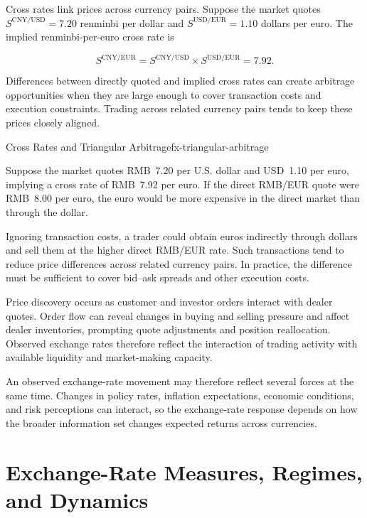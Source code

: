 Cross rates link prices across currency pairs. Suppose the market quotes $S^{\mathrm{CNY/USD}}=7.20$ renminbi per dollar and $S^{\mathrm{USD/EUR}}=1.10$ dollars per euro. The implied renminbi-per-euro cross rate is

\begin{equation*}
S^{\mathrm{CNY/EUR}}
=S^{\mathrm{CNY/USD}}\times
S^{\mathrm{USD/EUR}}
=7.92.
\label{eq:ch10-cross-rate}
\end{equation*}

Differences between directly quoted and implied cross rates can create arbitrage opportunities when they are large enough to cover transaction costs and execution constraints. Trading across related currency pairs tends to keep these prices closely aligned.

\begin{example}{Cross Rates and Triangular Arbitrage}{fx-triangular-arbitrage}

Suppose the market quotes RMB~7.20 per U.S. dollar and USD~1.10 per euro, implying a cross rate of RMB~7.92 per euro. If the direct RMB/EUR quote were RMB~8.00 per euro, the euro would be more expensive in the direct market than through the dollar.

Ignoring transaction costs, a trader could obtain euros indirectly through dollars and sell them at the higher direct RMB/EUR rate. Such transactions tend to reduce price differences across related currency pairs. In practice, the difference must be sufficient to cover bid--ask spreads and other execution costs.

\end{example}

Price discovery occurs as customer and investor
orders interact with dealer quotes. Order flow can
reveal changes in buying and selling pressure and
affect dealer inventories, prompting quote adjustments
and position reallocation. Observed exchange rates
therefore reflect the interaction of trading activity
with available liquidity and market-making capacity.

An observed exchange-rate movement may therefore reflect several forces at the same time. Changes in policy rates, inflation expectations, economic conditions, and risk perceptions can interact, so the exchange-rate response depends on how the broader information set changes expected returns across currencies.


\section{Exchange-Rate Measures, Regimes, and Dynamics}

